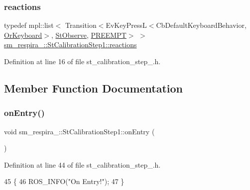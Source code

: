 \subsubsection{\texorpdfstring{reactions}{reactions}}
{\footnotesize\ttfamily typedef mpl\+::list$<$ Transition$<$Ev\+Key\+PressL$<$Cb\+Default\+Keyboard\+Behavior, \hyperlink{classsm__respira__1_1_1OrKeyboard}{Or\+Keyboard}$>$, \hyperlink{structsm__respira__1_1_1StObserve}{St\+Observe}, \hyperlink{classPREEMPT}{P\+R\+E\+E\+M\+PT}$>$ $>$ \hyperlink{structsm__respira__1_1_1StCalibrationStep1_a67c9271069e31b4c917e0f6c24256d34}{sm\+\_\+respira\+\_\+::\+St\+Calibration\+Step1\+::reactions}}



Definition at line 16 of file st\+\_\+calibration\+\_\+step\+\_.\+h.



\subsection{Member Function Documentation}
\mbox{\label{structsm__respira__1_1_1StCalibrationStep1_ab5935eecf1ce4037e27816db8df8e224}} 
\subsubsection{\texorpdfstring{on\+Entry()}{onEntry()}}
{\footnotesize\ttfamily void sm\+\_\+respira\+\_\+::\+St\+Calibration\+Step1\+::on\+Entry (\begin{DoxyParamCaption}{ }\end{DoxyParamCaption})\hspace{0.3cm}{\ttfamily [inline]}}



Definition at line 44 of file st\+\_\+calibration\+\_\+step\+\_.\+h.


\begin{DoxyCode}
45     \{
46         ROS\_INFO(\textcolor{stringliteral}{"On Entry!"});
47     \}
\end{DoxyCode}
\mbox{\label{structsm__respira__1_1_1StCalibrationStep1_a8b1c4ef9870ba819fa32794ff7a52ef2}} 
